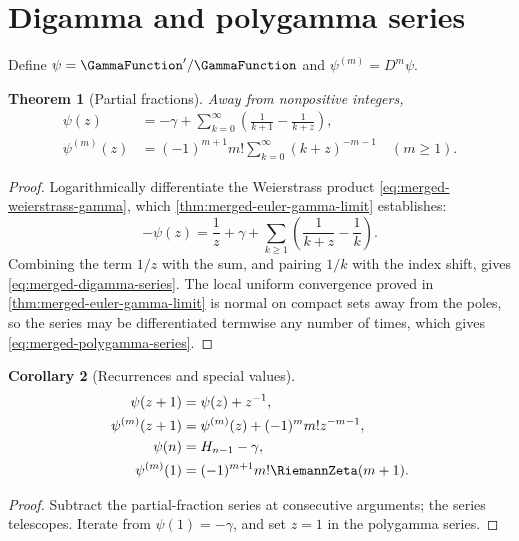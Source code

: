 \documentclass[11pt,a4paper,oneside,openany]{book}
\newtheorem{theorem}{Theorem}[chapter]
\newtheorem{corollary}[theorem]{Corollary}
\theoremstyle{definition}
\theoremstyle{remark}
\begin{document}
\section{Digamma and polygamma series}

Define $\psi=\GammaFunction'/\GammaFunction$ and $\psi^{(m)}=D^m\psi$.

\begin{theorem}[Partial fractions]
\label{thm:merged-polygamma-series}
Away from nonpositive integers,
\begin{align}
 \psi(z)&=-\gamma+\sum_{k=0}^{\infty}
     \left(\frac1{k+1}-\frac1{k+z}\right),                          \label{eq:merged-digamma-series}\\
 \psi^{(m)}(z)&=(-1)^{m+1}m!\sum_{k=0}^{\infty}(k+z)^{-m-1}
 \quad(m\geq1).                                                     \label{eq:merged-polygamma-series}
\end{align}
\end{theorem}

\begin{proof}
Logarithmically differentiate the Weierstrass product
\eqref{eq:merged-weierstrass-gamma}, which
\cref{thm:merged-euler-gamma-limit} establishes:
\[
 -\psi(z)=\frac1z+\gamma
 +\sum_{k\ge1}\left(\frac1{k+z}-\frac1k\right).
\]
Combining the term $1/z$ with the sum, and pairing $1/k$ with the index shift,
gives \eqref{eq:merged-digamma-series}.  The local uniform convergence proved
in \cref{thm:merged-euler-gamma-limit} is normal on compact sets away from the
poles, so the series may be differentiated termwise any number of times, which
gives \eqref{eq:merged-polygamma-series}.
\end{proof}

\begin{corollary}[Recurrences and special values]
\begin{align}
 \psi(z+1)&=\psi(z)+z^{-1},                                         \label{eq:merged-digamma-rec}\\
 \psi^{(m)}(z+1)&=\psi^{(m)}(z)+(-1)^mm!z^{-m-1},                   \label{eq:merged-polygamma-rec}\\
 \psi(n)&=H_{n-1}-\gamma,                                           \label{eq:merged-digamma-int}\\
 \psi^{(m)}(1)&=(-1)^{m+1}m!\RiemannZeta(m+1).                     \label{eq:merged-polygamma-one}
\end{align}
\end{corollary}

\begin{proof}
Subtract the partial-fraction series at consecutive arguments; the series
telescopes.  Iterate from $\psi(1)=-\gamma$, and set $z=1$ in the polygamma
series.
\end{proof}
\end{document}
